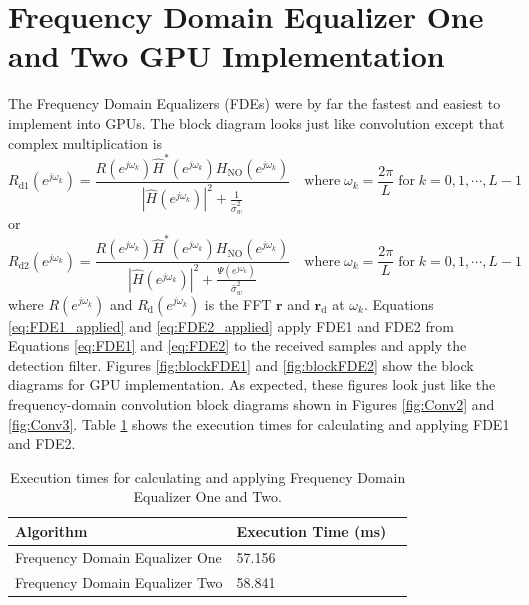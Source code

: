\section{Frequency Domain Equalizer One and Two GPU Implementation}
The Frequency Domain Equalizers (FDEs) were by far the fastest and easiest to implement into GPUs.
The block diagram looks just like convolution except that complex multiplication is
\begin{equation}
R_\text{d1}(e^{j\omega_k}) = \frac{R(e^{j\omega_k}) \hat{H}^\ast(e^{j\omega_k}) H_{\text{NO}}(e^{j\omega_k})}  {|\hat{H}(e^{j\omega_k})|^2  +  \frac{1}{\hat{\sigma}^2_w}} \quad
\text{where} \;
\omega_k = \frac{2\pi}{L} \;
\text{for} \;
k=0,1,\cdots,L-1
\label{eq:FDE1_applied}
\end{equation}
or
\begin{equation}
R_\text{d2}(e^{j\omega_k}) = \frac{R(e^{j\omega_k}) \hat{H}^\ast(e^{j\omega_k}) H_{\text{NO}}(e^{j\omega_k})}  {|\hat{H}(e^{j\omega_k})|^2  +  \frac{\Psi(e^{j\omega_k})}{\hat{\sigma}^2_w}} \quad
\text{where} \;
\omega_k = \frac{2\pi}{L} \;
\text{for} \;
k=0,1,\cdots,L-1
\label{eq:FDE2_applied}
\end{equation}
where $R(e^{j\omega_k})$ and $R_\text{d}(e^{j\omega_k})$ is the FFT $\mathbf{r}$ and $\mathbf{r}_\text{d}$ 
at $\omega_k$.
Equations \eqref{eq:FDE1_applied} and \ref{eq:FDE2_applied} apply FDE1 and FDE2 from Equations \eqref{eq:FDE1} and \eqref{eq:FDE2} to the received samples and apply the detection filter.
Figures \ref{fig:blockFDE1} and \ref{fig:blockFDE2} show the block diagrams for GPU implementation.
As expected, these figures look just like the frequency-domain convolution block diagrams shown in Figures \ref{fig:Conv2} and \ref{fig:Conv3}.
Table \ref{tab:FDEtimingComparison} shows the execution times for calculating and applying FDE1 and FDE2.
\begin{table}
\caption{Execution times for calculating and applying Frequency Domain Equalizer One and Two.}
\begin{center}
\begin{tabular}{lll}
	\toprule
	Algorithm						& Execution Time (ms)	\\ \midrule
	Frequency Domain Equalizer One 	& 57.156				\\
	Frequency Domain Equalizer Two	& 58.841				\\
	\bottomrule
\end{tabular}
\end{center}
\label{tab:FDEtimingComparison}
\end{table}
